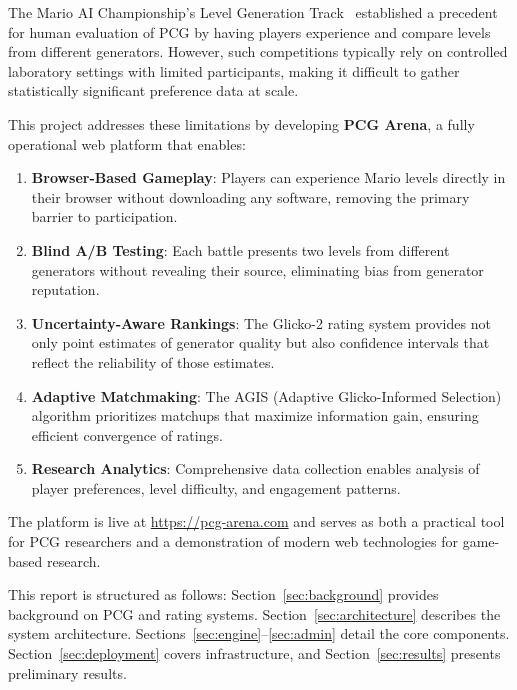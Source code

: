 \documentclass[11pt,a4paper]{article}
\theoremstyle{plain}
\theoremstyle{definition}
\theoremstyle{remark}
\begin{document}
The Mario AI Championship's Level Generation Track~\cite{marioai} established a precedent for human evaluation of PCG by having players experience and compare levels from different generators. However, such competitions typically rely on controlled laboratory settings with limited participants, making it difficult to gather statistically significant preference data at scale.

This project addresses these limitations by developing \textbf{PCG Arena}, a fully operational web platform that enables:

\begin{enumerate}
    \item \textbf{Browser-Based Gameplay}: Players can experience Mario levels directly in their browser without downloading any software, removing the primary barrier to participation.
    
    \item \textbf{Blind A/B Testing}: Each battle presents two levels from different generators without revealing their source, eliminating bias from generator reputation.
    
    \item \textbf{Uncertainty-Aware Rankings}: The Glicko-2 rating system provides not only point estimates of generator quality but also confidence intervals that reflect the reliability of those estimates.
    
    \item \textbf{Adaptive Matchmaking}: The AGIS (Adaptive Glicko-Informed Selection) algorithm prioritizes matchups that maximize information gain, ensuring efficient convergence of ratings.
    
    \item \textbf{Research Analytics}: Comprehensive data collection enables analysis of player preferences, level difficulty, and engagement patterns.
\end{enumerate}

The platform is live at \url{https://pcg-arena.com} and serves as both a practical tool for PCG researchers and a demonstration of modern web technologies for game-based research.

This report is structured as follows: Section~\ref{sec:background} provides background on PCG and rating systems. Section~\ref{sec:architecture} describes the system architecture. Sections~\ref{sec:engine}--\ref{sec:admin} detail the core components. Section~\ref{sec:deployment} covers infrastructure, and Section~\ref{sec:results} presents preliminary results.
\end{document}
